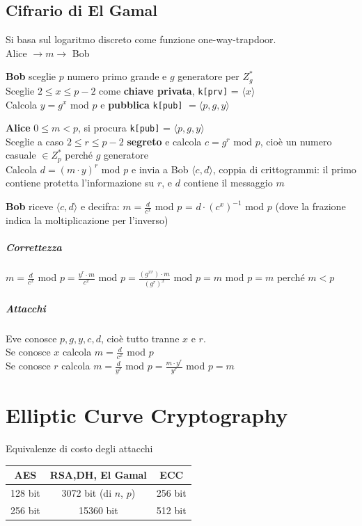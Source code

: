 \documentclass[10pt]{book}
\begin{document}
\section{Cifrario di El Gamal}
Si basa sul logaritmo discreto come funzione one-way-trapdoor.\\
Alice $\rightarrow m\rightarrow$ Bob
\begin{list}{}{}
	\item \textbf{Bob} sceglie $p$ numero primo grande e $g$ generatore per $Z_g^*$\\
	Sceglie $2\leq x \leq p-2$ come \textbf{chiave privata}, \texttt{k[prv]} = $\langle x\rangle$\\
	Calcola $y = g^x$ mod $p$ e \textbf{pubblica} \texttt{k[pub]} $=\langle p,g,y\rangle$
	\item \textbf{Alice} $0\leq m < p$, si procura \texttt{k[pub]} = $\langle p,g,y\rangle$\\
	Sceglie a caso $2 \leq r \leq p-2$ \textbf{segreto} e calcola $c = g^r$ mod $p$, cioè un numero casuale $\in Z_p^*$ perché $g$ generatore\\
	Calcola $d = \left(m\cdot y\right)^r$ mod $p$ e invia a Bob $\langle c,d\rangle$, coppia di crittogrammi: il primo contiene protetta l'informazione su $r$, e $d$ contiene il messaggio $m$
	\item \textbf{Bob} riceve $\langle c,d\rangle$ e decifra: $m = \frac{d}{c^x}$ mod $p$ = $d\cdot\left(c^x\right)^{-1}$ mod $p$ (dove la frazione indica la moltiplicazione per l'inverso)
\end{list}
\pagebreak
\paragraph{Correttezza} $m = \frac{d}{c^x}$ mod $p = \frac{y^r\cdot m}{c^x}$ mod $p = \frac{(g^{xr})\cdot m}{(g^r)^x}$ mod $p = m$ mod $p = m$ perché $m < p$
\paragraph{Attacchi} Eve conosce $p,g,y,c,d$, cioè tutto tranne $x$ e $r$.\\
Se conosce $x$ calcola $m = \frac{d}{c^x}$ mod $p$\\
Se conosce $r$ calcola $m = \frac{d}{y^r}$ mod $p = \frac{m\cdot y^r}{y^r}$ mod $p = m$
\chapter{Elliptic Curve Cryptography}
\begin{center}
Equivalenze di costo degli attacchi\\
\begin{tabular}{c | c | c}
AES & RSA,DH, El Gamal & ECC\\
\hline
128 bit & 3072 bit (di $n$, $p$) & 256 bit\\
256 bit & 15360 bit & 512 bit
\end{tabular}
\end{center}
\end{document}
